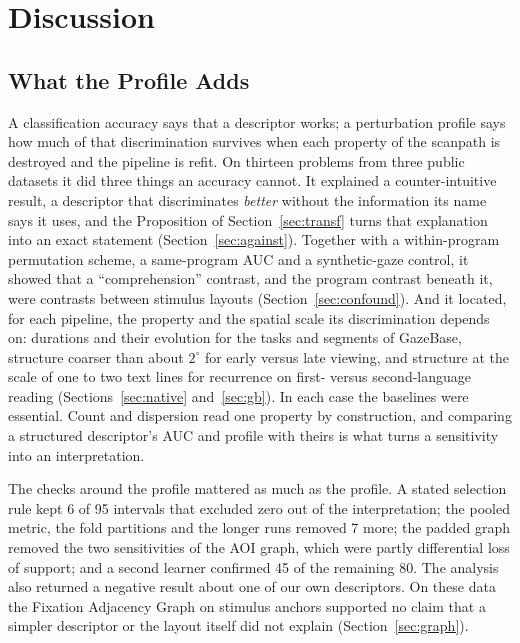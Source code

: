 \documentclass[man,floatsintext,12pt]{apa7}
\begin{document}


\section{Discussion}
\subsection{What the Profile Adds}
A classification accuracy says that a descriptor works; a perturbation profile says how much of that discrimination survives when each property of the scanpath is destroyed and the pipeline is refit. On thirteen problems from three public datasets it did three things an accuracy cannot. It explained a counter-intuitive result, a descriptor that discriminates \emph{better} without the information its name says it uses, and the Proposition of Section~\ref{sec:transf} turns that explanation into an exact statement (Section~\ref{sec:against}). Together with a within-program permutation scheme, a same-program AUC and a synthetic-gaze control, it showed that a ``comprehension'' contrast, and the program contrast beneath it, were contrasts between stimulus layouts (Section~\ref{sec:confound}). And it located, for each pipeline, the property and the spatial scale its discrimination depends on: durations and their evolution for the tasks and segments of GazeBase, structure coarser than about $2^\circ$ for early versus late viewing, and structure at the scale of one to two text lines for recurrence on first- versus second-language reading (Sections~\ref{sec:native} and~\ref{sec:gb}). In each case the baselines were essential. Count and dispersion read one property by construction, and comparing a structured descriptor's AUC and profile with theirs is what turns a sensitivity into an interpretation.

The checks around the profile mattered as much as the profile. A stated selection rule kept 6 of 95 intervals that excluded zero out of the interpretation; the pooled metric, the fold partitions and the longer runs removed 7 more; the padded graph removed the two sensitivities of the AOI graph, which were partly differential loss of support; and a second learner confirmed 45 of the remaining 80. The analysis also returned a negative result about one of our own descriptors. On these data the Fixation Adjacency Graph on stimulus anchors supported no claim that a simpler descriptor or the layout itself did not explain (Section~\ref{sec:graph}).
\end{document}
